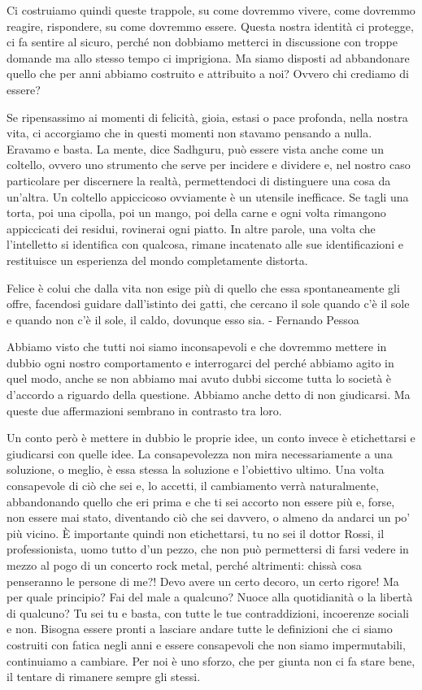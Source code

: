 \documentclass[12pt]{book} %
\begin{document}
Ci costruiamo quindi queste trappole, su come dovremmo vivere, come dovremmo reagire, rispondere, su come dovremmo
essere. Questa nostra identità ci protegge, ci fa sentire al sicuro, perché non dobbiamo metterci in discussione con
troppe domande ma allo stesso tempo ci imprigiona. Ma siamo disposti ad abbandonare quello che per anni abbiamo
costruito e attribuito a noi? Ovvero chi crediamo di essere? 

Se ripensassimo ai momenti di felicità, gioia, estasi o pace profonda, nella nostra vita, ci accorgiamo che in questi
momenti non stavamo pensando a nulla. Eravamo e basta. La mente, dice Sadhguru, può essere vista anche come un
coltello, ovvero uno strumento che serve per incidere e dividere e, nel nostro caso particolare per discernere la
realtà, permettendoci di distinguere una cosa da un'altra. Un coltello appiccicoso ovviamente è un utensile inefficace.
Se tagli una torta, poi una cipolla, poi un mango, poi della carne e ogni volta rimangono appiccicati dei residui,
rovinerai ogni piatto. In altre parole, una volta che l'intelletto si identifica con qualcosa, rimane incatenato alle
sue identificazioni e restituisce un esperienza del mondo completamente distorta.

Felice è colui che dalla vita non esige più di quello che essa spontaneamente gli offre, facendosi guidare dall'istinto
dei gatti, che cercano il sole quando c'è il sole e quando non c'è il sole, il caldo, dovunque esso sia. - Fernando
Pessoa

Abbiamo visto che tutti noi siamo inconsapevoli e che dovremmo mettere in dubbio ogni nostro comportamento e
interrogarci del perché abbiamo agito in quel modo, anche se non abbiamo mai avuto dubbi siccome tutta lo società è
d'accordo a riguardo della questione. Abbiamo anche detto di non giudicarsi. Ma queste due
affermazioni sembrano in contrasto tra loro.

Un conto però è mettere in dubbio le proprie idee, un conto invece è etichettarsi e giudicarsi con quelle idee. La
consapevolezza non mira necessariamente a una soluzione, o meglio, è essa stessa la soluzione e
l'obiettivo ultimo. Una volta consapevole di ciò che sei e, lo accetti, il cambiamento verrà
naturalmente, abbandonando quello che eri prima e che ti sei accorto non essere più e, forse, non essere mai stato,
diventando ciò che sei davvero, o almeno da andarci un po' più vicino. È importante quindi non
etichettarsi, tu no sei il dottor Rossi, il professionista, uomo tutto d'un pezzo, che non può
permettersi di farsi vedere in mezzo al pogo di un concerto rock metal, perché altrimenti: chissà cosa penseranno le
persone di me?! Devo avere un certo decoro, un certo rigore! Ma per quale principio? Fai del male a qualcuno? Nuoce
alla quotidianità o la libertà di qualcuno? Tu sei tu e basta, con tutte le tue contraddizioni, incoerenze sociali e
non. Bisogna essere pronti a lasciare andare tutte le definizioni che ci siamo costruiti con fatica negli anni e essere
consapevoli che non siamo impermutabili, continuiamo a cambiare. Per noi è uno sforzo, che per giunta non ci fa stare
bene, il tentare di rimanere sempre gli stessi.
\end{document}
